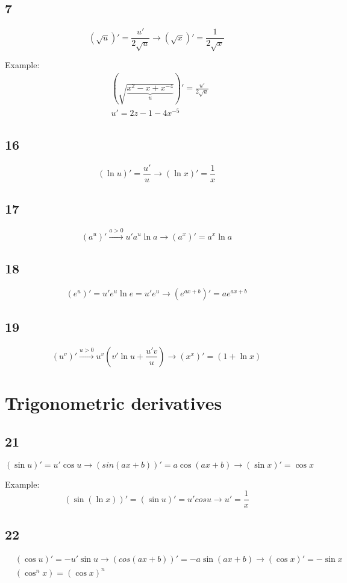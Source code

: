 \subsection{7}
\[ (\sqrt{u})' = \frac{u'}{2\sqrt{u}} \to (\sqrt{x})' = \frac{1}{2\sqrt{x}} \]

Example:
\begin{align*}
&(\sqrt{\underbrace{x^2-x+x^{-4}}_u})' = \frac{u'}{2\sqrt{u}} \\
&u' = 2z-1-4x^{-5}
\end{align*}

\subsection{16}
\[ (\ln u)' = \frac{u'}{u} \to (\ln x)' = \frac{1}{x} \]

\subsection{17}
\[ (a^u)' \overset{a>0}{\longrightarrow} u'a^u\ln a \to (a^x)' = a^x\ln a \]

\subsection{18}
\[ (e^u)' = u'e^u\ln e = u'e^u \to (e^{ax+b})' = ae^{ax+b} \]

\subsection{19}
\[ (u^v)' \overset{u>0}{\longrightarrow} u^v(v'\ln u+\frac{u'v}{u}) \to (x^x)' = (1 + \ln x) \]


\section{Trigonometric derivatives}
\subsection{21}
\[ (\sin u)' = u'\cos u \longrightarrow (sin(ax+b))' = a \cos(ax+b) \longrightarrow (\sin x)' = \cos x \]

Example:
\[ (\sin(\ln x))' = (\sin u)' = u'cosu \to u' = \frac{1}{x}\]

\subsection{22}
\begin{align*}
&(\cos u)' = -u'\sin u \longrightarrow (cos(ax+b))' = -a\sin(ax+b) \to (\cos x)' = -\sin x \\
&(\cos^n x) = (\cos x)^n \\
\end{align*}

